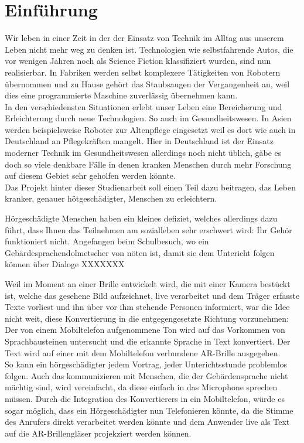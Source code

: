 \chapter{Einführung}
Wir leben in einer Zeit in der der Einsatz von Technik im Alltag aus unserem Leben nicht mehr weg zu denken ist. 
Technologien wie selbstfahrende Autos, die vor wenigen Jahren noch als Science Fiction klassifiziert wurden, sind nun realisierbar. 
In Fabriken werden selbst komplexere Tätigkeiten von Robotern übernommen und zu Hause gehört das Staubsaugen der Vergangenheit an, 
weil dies eine programmierte Maschine zuverlässig übernehmen kann. \\
In den verschiedensten Situationen erlebt unser Leben eine Bereicherung und Erleichterung durch neue Technologien. So auch im Gesundheitswesen. 
In Asien werden beispielsweise Roboter zur Altenpflege eingesetzt weil es dort wie auch in Deutschland an Pflegekräften mangelt. 
Hier in Deutschland ist der Einsatz moderner Technik im Gesundheitswesen allerdings noch nicht üblich, gäbe es doch so viele denkbare Fälle in denen kranken Menschen durch mehr Forschung auf diesem Gebiet sehr geholfen werden könnte.\\
Das Projekt hinter dieser Studienarbeit soll einen Teil dazu beitragen, das Leben kranker, genauer hötgeschädigter, Menschen zu erleichtern.\par
Hörgeschädigte Menschen haben ein kleines defiziet, welches allerdings dazu führt, dass Ihnen das Teilnehmen am sozialleben sehr erschwert wird: 
Ihr Gehör funktioniert nicht. Angefangen beim Schulbesuch, wo ein Gebärdesprachendolmetscher von nöten ist, damit sie dem Untericht folgen können über Dialoge XXXXXXX \par
Weil im Moment an einer Brille entwickelt wird, die mit einer Kamera bestückt ist, welche das gesehene Bild aufzeichnet, live verarbeitet und dem Träger erfasste Texte vorliest und ihn über vor ihm stehende Personen informiert, 
war die Idee nicht weit, diese Konvertierung in die entgegengesetzte Richtung vorzunehmen: 
Der von einem Mobiltelefon aufgenommene Ton wird auf das Vorkommen von Sprachbausteinen untersucht und die erkannte Sprache in Text konvertiert. 
Der Text wird auf einer mit dem Mobiltelefon verbundene AR-Brille ausgegeben.\\
So kann ein hörgeschädigter jedem Vortrag, jeder Unterichtsstunde problemlos folgen. 
Auch das kommunizieren mit Menschen, die der Gebärdensprache nicht mächtig sind, wird vereinfacht, da diese einfach in das Microphone sprechen müssen. 
Durch die Integration des Konvertierers in ein Mobiltelefon, würde es sogar möglich, dass ein Hörgeschädigter nun Telefonieren könnte, da die Stimme des Anrufers direkt verarbeitet werden könnte und dem Anwender live als Text auf die AR-Brillengläser projekziert werden können.

